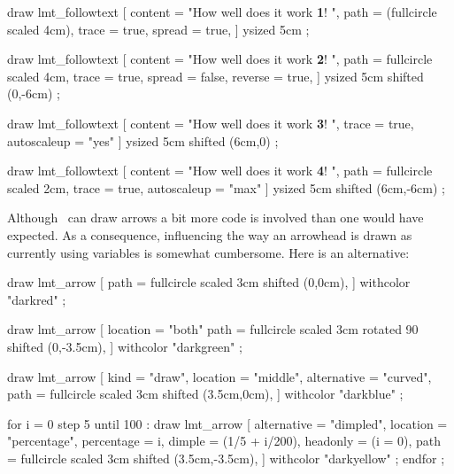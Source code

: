 \startbuffer
{}
    draw lmt_followtext [
        content = "How well does it work {\bf 1}! ",
        path    = (fullcircle scaled 4cm),
        trace   = true,
        spread  = true,
    ] ysized 5cm ;

    draw lmt_followtext [
        content = "How well does it work {\bf 2}! ",
        path    = fullcircle scaled 4cm,
        trace   = true,
        spread  = false,
        reverse = true,
    ] ysized 5cm shifted (0,-6cm) ;

    draw lmt_followtext [
        content     = "How well does it work {\bf 3}! ",
        trace       = true,
        autoscaleup = "yes"
    ] ysized 5cm shifted (6cm,0) ;

    draw lmt_followtext [
        content     = "How well does it work {\bf 4}! ",
        path        = fullcircle scaled 2cm,
        trace       = true,
        autoscaleup = "max"
    ] ysized 5cm shifted (6cm,-6cm) ;
\stopMPcode
\stopbuffer

\typebuffer[option=TEX]

\startlinecorrection
\getbuffer
\stoplinecorrection

Although \METAPOST\ can draw arrows a bit more code is involved than one would
have expected. As a consequence, influencing the way an arrowhead is drawn as
currently using variables is somewhat cumbersome. Here is an alternative:

\startbuffer
{}
    draw lmt_arrow [
        path = fullcircle
            scaled  3cm
            shifted (0,0cm),
    ] withcolor "darkred" ;

    draw lmt_arrow [
        location = "both"
        path     = fullcircle
            scaled  3cm
            rotated 90
            shifted (0,-3.5cm),
    ] withcolor "darkgreen" ;

    draw lmt_arrow [
        kind        = "draw",
        location    = "middle",
        alternative = "curved",
        path        = fullcircle
            scaled  3cm
            shifted (3.5cm,0cm),
    ] withcolor "darkblue" ;

    for i = 0 step 5 until 100 :
        draw lmt_arrow [
            alternative = "dimpled",
            location    = "percentage",
            percentage  = i,
            dimple      = (1/5 + i/200),
            headonly    = (i = 0),
            path        = fullcircle
                scaled  3cm
                shifted (3.5cm,-3.5cm),
        ] withcolor "darkyellow" ;
    endfor ;
\stopMPcode
\stopbuffer


